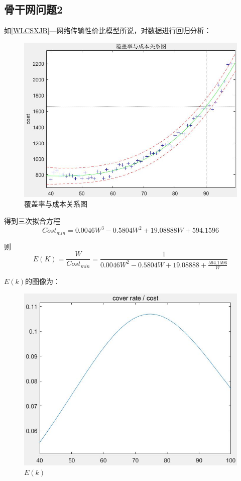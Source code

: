 \documentclass[UTF8,12pt]{ctexart}
\begin{document}
    \subsection{骨干网问题2}
        如\ref{WLCSXJB}—网络传输性价比模型所说，对数据进行回归分析：
        \begin{figure}[H]
            \centering
            \includegraphics[scale=0.6]{cosHG.jpg}   %
            \caption{覆盖率与成本关系图}
            \end{figure} 
        得到三次拟合方程
        $$Cost_{min}=0.0046W^3-0.5804W^2+19.08888W+594.1596$$\par
        则
        $$E(K)=\frac{W}{Cost_{min}}=\frac{1}{0.0046W^2-0.5804W+19.08888+\frac{594.1596}{W}}$$\par
        $E(k)$的图像为：
        \begin{figure}[H]
            \centering
            \includegraphics[scale=0.6]{cosEK.jpg}   %
            \caption{$E(k)$}
            \end{figure} 
\end{document}
